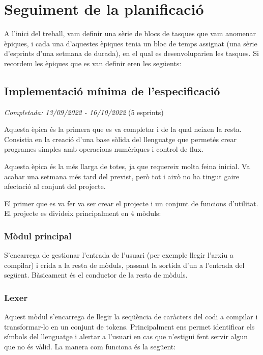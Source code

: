 ﻿\documentclass{article}
\begin{document}
\section{Seguiment de la planificació}
A l'inici del treball, vam definir una sèrie de blocs de tasques que vam anomenar
èpiques, i cada una d'aquestes èpiques tenia un bloc de temps assignat (una sèrie
d'esprints d'una setmana de durada), en el qual es desenvoluparien les tasques. 
Si recordem les èpiques que es van definir eren les següents:

    \subsection{Implementació mínima de l'especificació}
        \textit{Completada: 13/09/2022 - 16/10/2022} (5 esprints)

        Aquesta èpica és la primera que es va completar i de la qual neixen la 
        resta. Consistia en la creació d'una base sòlida del llenguatge que 
        permetés crear programes simples amb operacions numèriques i control
        de flux.

        Aquesta èpica és la més llarga de totes, ja que requereix molta feina
        inicial. Va acabar una setmana més tard del previst, però tot i això no
        ha tingut gaire afectació al conjunt del projecte.

        El primer que es va fer va ser crear el projecte i un conjunt de funcions
        d'utilitat. El projecte es divideix principalment en 4 mòduls:

            \subsubsection{Mòdul principal}
            S'encarrega de gestionar l'entrada de l'usuari
                (per exemple llegir l'arxiu a compilar) i crida a la resta de mòduls, passant
                la  sortida d'un a l'entrada del següent. Bàsicament és el conductor de
                la resta de mòduls.

            \subsubsection{Lexer}
            Aquest mòdul s'encarrega de llegir la seqüència de
                caràcters del codi a compilar i transformar-lo en un conjunt de
                tokens. Principalment ens permet identificar els símbols del 
                llenguatge i alertar a l'usuari en cas que n'estigui fent servir
                algun que no és vàlid. La manera com funciona és la següent:
\end{document}
